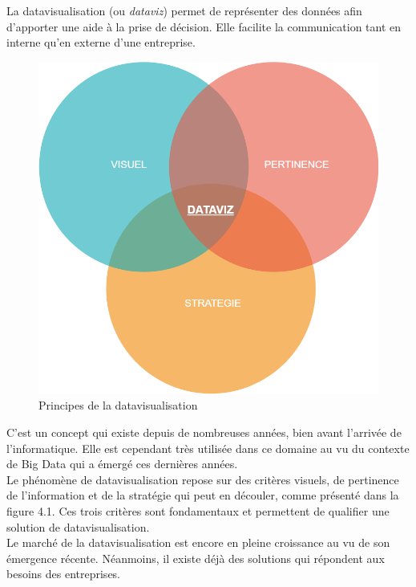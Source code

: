 La datavisualisation (ou \textit{dataviz}) permet de représenter des données afin d'apporter une aide à la prise de décision. Elle facilite la communication tant en interne qu'en externe d'une entreprise.\\

\begin{figure}[H]
\begin{center}
\includegraphics[scale=0.3]{resources/dataviz.png}
\caption{Principes de la datavisualisation}
\end{center}
\end{figure}

C'est un concept qui existe depuis de nombreuses années, bien avant l'arrivée de l'informatique. Elle est cependant très utilisée dans ce domaine au vu du contexte de Big Data qui a émergé ces dernières années.\\

Le phénomène de datavisualisation repose sur des critères visuels, de pertinence de l'information et de la stratégie qui peut en découler, comme présenté dans la figure 4.1. Ces trois critères sont fondamentaux et permettent de qualifier une solution de datavisualisation.\\

Le marché de la datavisualisation est encore en pleine croissance au vu de son émergence récente. Néanmoins, il existe déjà des solutions qui répondent aux besoins des entreprises.
